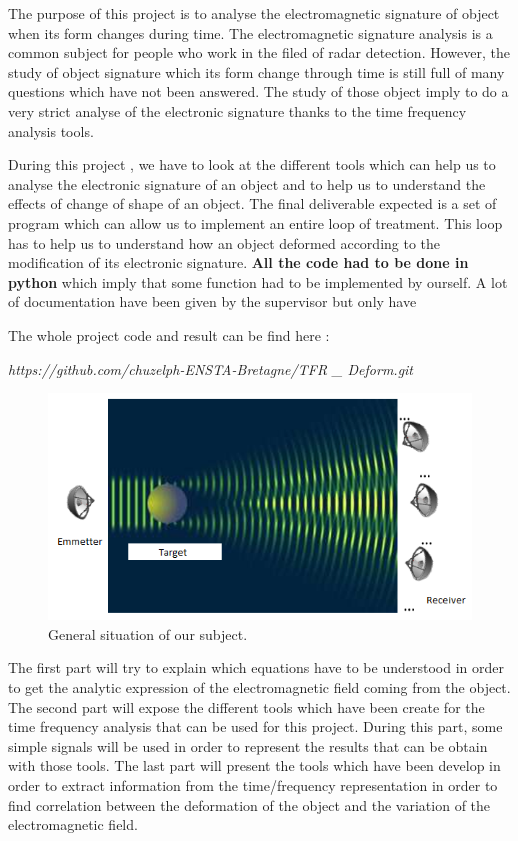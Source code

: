The purpose of this project is to analyse the electromagnetic signature of object when its form changes during time. The electromagnetic signature analysis is a common subject for people who work in the filed of radar detection. However, the study of object signature which its form change through time is still full of many questions which have not been answered. The study of those object imply to do a very strict analyse of the electronic signature thanks to the time frequency analysis tools.

\bigskip

During this project \cite{Analysis}, we have to look at the different tools which can help us to analyse the electronic signature of an object and to help us to understand the effects of change of shape of an object. The final deliverable expected is a set of program which can allow us to implement an entire loop of treatment. This loop has to help us to understand how an object deformed according to the modification of its electronic signature. \textbf{All the code had to be done in python} which imply that some function had to be implemented by ourself. A lot of documentation have been given by the supervisor  but only have

\bigskip

The whole project code and result can be find here :

\textit{https://github.com/chuzelph-ENSTA-Bretagne/TFR \_ Deform.git}


\begin{figure}[H]
\centering
    \includegraphics[scale=1,angle=0]{Images/Image1.PNG}
    \caption{General situation of our subject.}
    \label{fig:Image1}
\end{figure}

\bigskip

The first part will try to explain which equations have to be understood in order to get the analytic expression of the electromagnetic field coming from the object.
The second part will expose the different tools which have been create for the time frequency analysis that can be used for this project. During this part, some simple signals will be used in order to represent the results that can be obtain with those tools.
The last part will present the tools which have been develop in order to extract information from the time/frequency representation in order to find correlation between the deformation of the object and the variation of the electromagnetic field.
